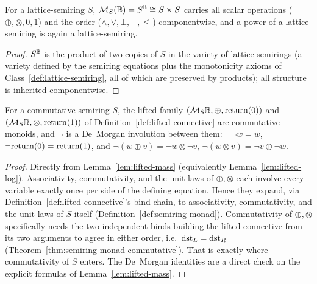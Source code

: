 \begin{lemma}[Pointwise]
\label{lem:pointwise}
\leanok
For a lattice-semiring $S$, $\mathcal M_{S}(\mathbb B) = S^{\mathbb B} \cong S\times
S$ carries all scalar operations ($\oplus,\otimes,0,1$) and the order
($\wedge,\vee,\bot,\top,\le$) componentwise, and a power of a
lattice-semiring is again a lattice-semiring.
\end{lemma}

\begin{proof}
\leanok
$S^{\mathbb B}$ is the product of two copies of $S$ in the
variety of lattice-semirings (a variety defined by the semiring
equations plus the monotonicity axioms of
Class~\ref{def:lattice-semiring}, all of which are preserved by
products); all structure is inherited componentwise.
\end{proof}

\begin{lemma}
\label{lem:linear-lift}
\leanok
For a commutative semiring $S$, the lifted family
$(\mathcal M_{S}\mathbb B, \oplus, \mathrm{return}(0))$ and $(\mathcal M_{S}\mathbb B, \otimes, \mathrm{return}(1))$ of
Definition~\ref{def:lifted-connective} are commutative monoids, and
$\neg$ is a De~Morgan involution between them: $\neg\neg w = w$,
$\neg \mathrm{return}(0) = \mathrm{return}(1)$, and
$\neg(w \oplus v) = \neg w \otimes \neg v$,
$\neg(w \otimes v) = \neg v \oplus \neg w$.
\end{lemma}

\begin{proof}
\leanok
Directly from Lemma~\ref{lem:lifted-mass} (equivalently
Lemma~\ref{lem:lifted-log}). Associativity, commutativity, and the unit
laws of $\oplus,\otimes$ each involve every variable exactly once per
side of the defining equation. Hence they expand, via
Definition~\ref{def:lifted-connective}'s bind chain, to associativity,
commutativity, and the unit laws of $S$ itself
(Definition~\ref{def:semiring-monad}). Commutativity of $\oplus,\otimes$
specifically needs the two independent binds building the lifted
connective from its two arguments to agree in either order, i.e.\
$\mathrm{dst}_L = \mathrm{dst}_R$ (Theorem~\ref{thm:semiring-monad-commutative}). That is
exactly where commutativity of $S$ enters. The De~Morgan identities are
a direct check on the explicit formulas of Lemma~\ref{lem:lifted-mass}.
\end{proof}

